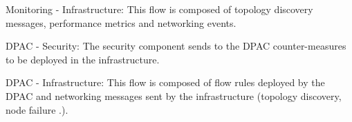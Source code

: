  Monitoring - Infrastructure: This flow is composed of topology discovery messages, performance metrics and networking events.

 DPAC - Security: The security component sends to the DPAC counter-measures to be deployed in the infrastructure.

 DPAC - Infrastructure: This flow is composed of flow rules deployed by the DPAC and networking messages sent by the infrastructure (\eg topology discovery, node failure \etc.).



